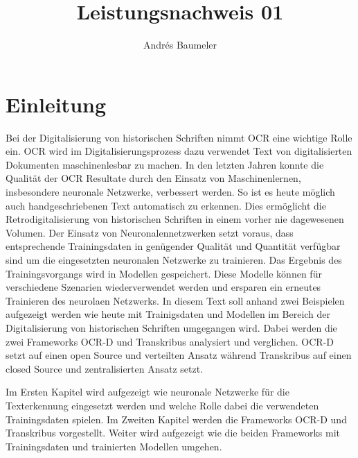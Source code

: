 \documentclass[a4paper,oneside, 12pt]{report}
\title{Leistungsnachweis 01}
\author{Andrés Baumeler}
\begin{document}

\pagestyle{empty} %





\cleardoublepage
\tableofcontents %
\cleardoublepage %

\pagestyle{plain} %



\chapter{Einleitung}\label{sec:motivation}
Bei der Digitalisierung von historischen Schriften nimmt \ac{OCR} eine wichtige Rolle ein. \ac{OCR}  wird im Digitalisierungsprozess dazu verwendet Text von digitalisierten Dokumenten maschinenlesbar zu machen. In den letzten Jahren konnte die Qualität der OCR Resultate durch den Einsatz von Maschinenlernen, insbesondere neuronale Netzwerke, verbessert werden. So ist es heute möglich auch handgeschriebenen Text automatisch zu erkennen. Dies ermöglicht die Retrodigitalisierung von historischen Schriften in einem vorher nie dagewesenen Volumen. Der Einsatz von Neuronalennetzwerken setzt voraus, dass entsprechende Trainingsdaten in genügender Qualität und Quantität verfügbar sind um die eingesetzten neuronalen Netzwerke zu trainieren. Das Ergebnis des Trainingsvorgangs wird in Modellen gespeichert. Diese Modelle können für verschiedene Szenarien wiederverwendet werden und ersparen ein erneutes Trainieren des neurolaen Netzwerks. In diesem Text soll anhand zwei Beispielen aufgezeigt werden wie heute mit Trainigsdaten und Modellen im Bereich der Digitalisierung von historischen Schriften umgegangen wird. Dabei werden die zwei Frameworks OCR-D und Transkribus analysiert und verglichen. OCR-D setzt auf einen open Source und verteilten Ansatz während Transkribus auf einen closed Source und zentralisierten Ansatz setzt. 

Im Ersten Kapitel wird aufgezeigt wie neuronale Netzwerke für die Texterkennung eingesetzt werden und welche Rolle dabei die verwendeten Trainingsdaten spielen.  Im Zweiten Kapitel werden die Frameworks OCR-D und Transkribus vorgestellt. Weiter wird aufgezeigt wie die beiden Frameworks mit Trainingsdaten und trainierten Modellen umgehen. 
\end{document}
